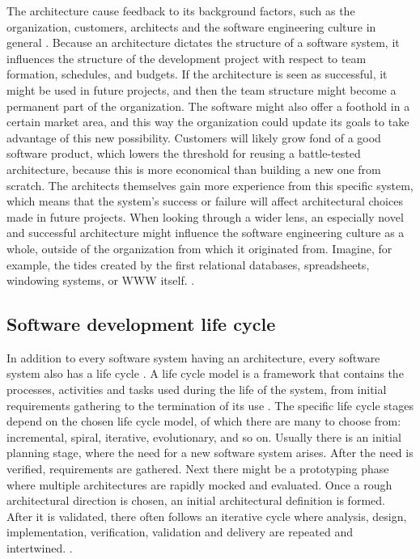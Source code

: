 \documentclass[utf8,english]{gradu3}
\begin{document}
The architecture cause feedback to its background factors, such as the
organization, customers, architects and the software engineering culture in
general \parencite{Bass1998}. Because an architecture dictates the structure of
a software system, it influences the structure of the development project with
respect to team formation, schedules, and budgets. If the architecture is seen as
successful, it might be used in future projects, and then the team structure
might become a permanent part of the organization. The software might also offer
a foothold in a certain market area, and this way the organization could update
its goals to take advantage of this new possibility. Customers will likely grow
fond of a good software product, which lowers the threshold for reusing a
battle-tested architecture, because this is more economical than building a new
one from scratch. The architects themselves gain more experience from this
specific system, which means that the system's success or failure will affect
architectural choices made in future projects. When looking through a wider
lens, an especially novel and successful architecture might influence the
software engineering culture as a whole, outside of the organization from which
it originated from. Imagine, for example, the tides created by the first relational
databases, spreadsheets, windowing systems, or WWW itself.
\parencite[10-11]{Bass1998}.


\subsection{Software development life cycle}

In addition to every software system having an architecture, every software
system also has a life cycle \parencite[17]{IEEE12207}. A life
cycle model is a framework that contains the processes, activities and tasks
used during the life of the system, from initial requirements gathering to the
termination of its use \parencite[3]{IEEE42010}. The specific life cycle stages
depend on the chosen life cycle model, of which there are many to choose from:
incremental, spiral, iterative, evolutionary, and so on. Usually there is an
initial planning stage, where the need for a new software system arises. After
the need is verified, requirements are gathered. Next there might be a
prototyping phase where multiple architectures are rapidly mocked and evaluated.
Once a rough architectural direction is chosen, an initial architectural
definition is formed. After it is validated, there often follows an iterative
cycle where analysis, design, implementation, verification, validation and
delivery are repeated and intertwined. \parencite[18]{IEEE12207}.
\end{document}
